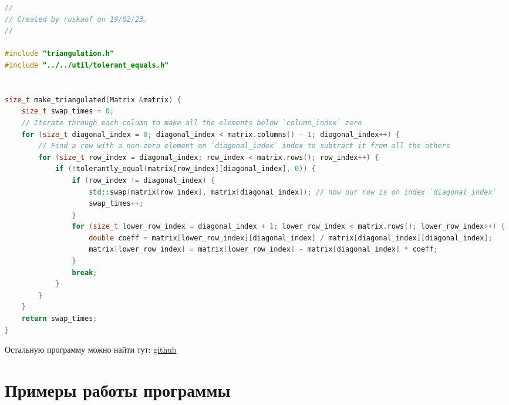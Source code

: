 \documentclass[12pt]{article}
\begin{document}
\begin{adjustbox}{width=\textwidth, center}
\begin{lstlisting}[language=C++, caption=trianguation.cpp]
//
// Created by ruskaof on 19/02/23.
//

#include "triangulation.h"
#include "../../util/tolerant_equals.h"


size_t make_triangulated(Matrix &matrix) {
    size_t swap_times = 0;
    // Iterate through each column to make all the elements below `column_index` zero
    for (size_t diagonal_index = 0; diagonal_index < matrix.columns() - 1; diagonal_index++) {
        // Find a row with a non-zero element on `diagonal_index` index to subtract it from all the others
        for (size_t row_index = diagonal_index; row_index < matrix.rows(); row_index++) {
            if (!tolerantly_equal(matrix[row_index][diagonal_index], 0)) {
                if (row_index != diagonal_index) {
                    std::swap(matrix[row_index], matrix[diagonal_index]); // now our row is on index `diagonal_index`
                    swap_times++;
                }
                for (size_t lower_row_index = diagonal_index + 1; lower_row_index < matrix.rows(); lower_row_index++) {
                    double coeff = matrix[lower_row_index][diagonal_index] / matrix[diagonal_index][diagonal_index];
                    matrix[lower_row_index] = matrix[lower_row_index] - matrix[diagonal_index] * coeff;
                }
                break;
            }
        }
    }
    return swap_times;
}

\end{lstlisting}
\end{adjustbox}

Остальную программу можно найти тут: \href{https://github.com/ruskaof/itmo-numberical_methods-lab1}{github}

\section{Примеры работы программы}
\end{document}
